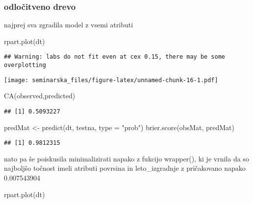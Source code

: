 \documentclass[
]{article}
\newenvironment{Shaded}{\begin{snugshade}}{\end{snugshade}}
\newcommand{\AttributeTok}[1]{\textcolor[rgb]{0.77,0.63,0.00}{#1}}
\newcommand{\FunctionTok}[1]{\textcolor[rgb]{0.00,0.00,0.00}{#1}}
\newcommand{\NormalTok}[1]{#1}
\newcommand{\OtherTok}[1]{\textcolor[rgb]{0.56,0.35,0.01}{#1}}
\newcommand{\StringTok}[1]{\textcolor[rgb]{0.31,0.60,0.02}{#1}}
\begin{document}
\hypertarget{odloux10ditveno-drevo}{%
\subsubsection{odločitveno drevo}\label{odloux10ditveno-drevo}}

najprej sva zgradila model z vsemi atributi

\begin{Shaded}
\begin{Highlighting}[]
\FunctionTok{rpart.plot}\NormalTok{(dt)}
\end{Highlighting}
\end{Shaded}

\begin{verbatim}
## Warning: labs do not fit even at cex 0.15, there may be some overplotting
\end{verbatim}

\texttt{[image: seminarska\_files/figure-latex/unnamed-chunk-16-1.pdf]}

\begin{Shaded}
\begin{Highlighting}[]
\FunctionTok{CA}\NormalTok{(observed,predicted)}
\end{Highlighting}
\end{Shaded}

\begin{verbatim}
## [1] 0.5093227
\end{verbatim}

\begin{Shaded}
\begin{Highlighting}[]
\NormalTok{predMat }\OtherTok{\textless{}{-}} \FunctionTok{predict}\NormalTok{(dt, testna, }\AttributeTok{type =} \StringTok{"prob"}\NormalTok{)}
\FunctionTok{brier.score}\NormalTok{(obsMat, predMat)}
\end{Highlighting}
\end{Shaded}

\begin{verbatim}
## [1] 0.9812315
\end{verbatim}

nato pa še poiskusila minimalizirati napako z fukcijo wrapper(), ki je
vrnila da so najboljšo točnost imeli atributi povrsina in
leto\_izgradnje z pričakovano napako 0.007543904

\begin{Shaded}
\begin{Highlighting}[]
\FunctionTok{rpart.plot}\NormalTok{(dt)}
\end{Highlighting}
\end{Shaded}
\end{document}
